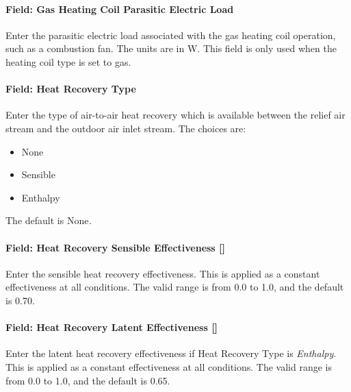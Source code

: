 \paragraph{Field: Gas Heating Coil Parasitic Electric Load}\label{field-gas-heating-coil-parasitic-electric-load-7}

Enter the parasitic electric load associated with the gas heating coil operation, such as a combustion fan. The units are in W. This field is only used when the heating coil type is set to gas.

\paragraph{Field: Heat Recovery Type}\label{field-heat-recovery-type-8}

Enter the type of air-to-air heat recovery which is available between the relief air stream and the outdoor air inlet stream. The choices are:

\begin{itemize}
\item
  None
\item
  Sensible
\item
  Enthalpy
\end{itemize}

The default is None\emph{.}

\paragraph{\texorpdfstring{Field: Heat Recovery Sensible Effectiveness {[]}}{Field: Heat Recovery Sensible Effectiveness }}\label{field-heat-recovery-sensible-effectiveness}

Enter the sensible heat recovery effectiveness. This is applied as a constant effectiveness at all conditions. The valid range is from 0.0 to 1.0, and the default is 0.70.

\paragraph{\texorpdfstring{Field: Heat Recovery Latent Effectiveness {[]}}{Field: Heat Recovery Latent Effectiveness }}\label{field-heat-recovery-latent-effectiveness}

Enter the latent heat recovery effectiveness if Heat Recovery Type is \emph{Enthalpy}. This is applied as a constant effectiveness at all conditions. The valid range is from 0.0 to 1.0, and the default is 0.65.

